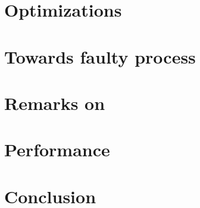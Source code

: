 \documentclass[a4paper,10pt]{article}
\begin{document}
\section{Optimizations}


\section{Towards faulty process\label{sec:faulty}}


\section{Remarks on \cite{Aceto2004Notes}\label{sec:remarks}}


\section{Performance\label{sec:performance}}


\section{Conclusion}
	



\end{document}
